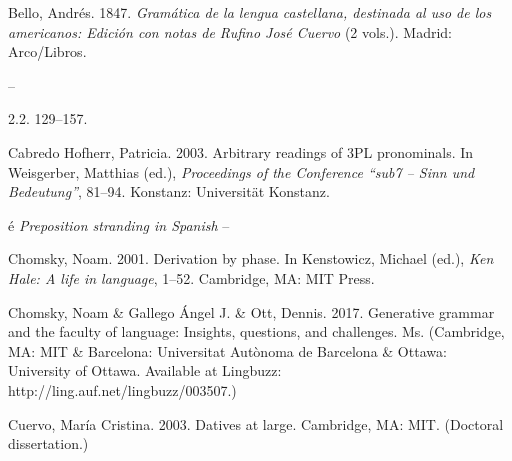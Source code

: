 \documentclass[output=paper]{langsci/langscibook}
\begin{document}
Bello, Andrés. 1847. \textit{Gramática de la lengua castellana, destinada al uso de los americanos: Edición con notas de Rufino José Cuervo} (2 vols.). Madrid: Arco/Libros.

\begin{styleBodyTextIn}
  –
\end{styleBodyTextIn}

\begin{styleBodyTextIn}
 \textstylest{} 2.2. 129–157.
\end{styleBodyTextIn}

\begin{styleBodyTextIn}
Cabredo Hofherr, Patricia. 2003. Arbitrary readings of 3PL pronominals. In Weisgerber, Matthias (ed.), \textit{Proceedings of the Conference “sub7 – Sinn und Bedeutung”}, 81–94. Konstanz: Universität Konstanz.
\end{styleBodyTextIn}

\begin{styleBodyTextIn}
é \emph{Preposition stranding in Spanish} –
\end{styleBodyTextIn}

\begin{styleBodyTextIn}
Chomsky, Noam. 2001. Derivation by phase. In Kenstowicz, Michael (ed.), \textit{Ken Hale: A life in language}, 1–52. Cambridge, MA: MIT Press.
\end{styleBodyTextIn}

\begin{styleBodyTextIn}
Chomsky, Noam \& Gallego Ángel J. \& Ott, Dennis. 2017. Generative grammar and the faculty of language: Insights, questions, and challenges. Ms. (Cambridge, MA: MIT \& Barcelona: Universitat Autònoma de Barcelona \& Ottawa: University of Ottawa. Available at Lingbuzz: http://ling.auf.net/lingbuzz/003507.)
\end{styleBodyTextIn}

Cuervo, María Cristina. 2003. Datives at large. Cambridge, MA: MIT. (Doctoral dissertation.)
\end{document}
